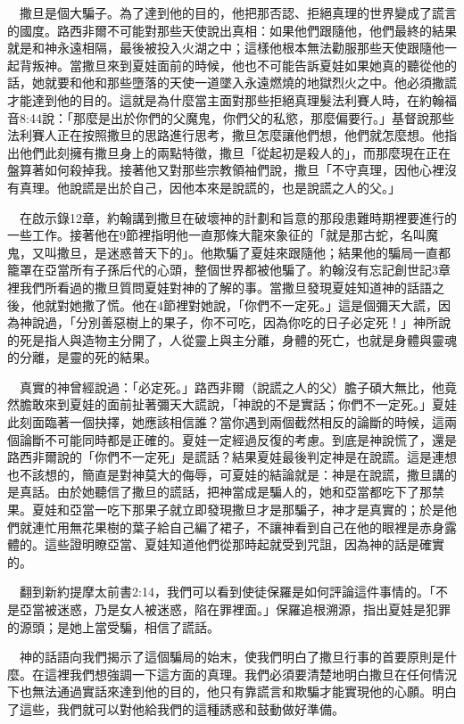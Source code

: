 \documentclass{book}
\begin{document}
　撒旦是個大騙子。為了達到他的目的，他把那否認、拒絕真理的世界變成了謊言的國度。路西非爾不可能對那些天使說出真相：如果他們跟隨他，他們最終的結果就是和神永遠相隔，最後被投入火湖之中；這樣他根本無法勸服那些天使跟隨他一起背叛神。當撒旦來到夏娃面前的時候，他也不可能告訴夏娃如果她真的聽從他的話，她就要和他和那些墮落的天使一道墜入永遠燃燒的地獄烈火之中。他必須撒謊才能達到他的目的。這就是為什麼當主面對那些拒絕真理髮法利賽人時，在約翰福音8:44說：「那麼是出於你們的父魔鬼，你們父的私慾，那麼偏要行。」基督說那些法利賽人正在按照撒旦的思路進行思考，撒旦怎麼讓他們想，他們就怎麼想。他指出他們此刻擁有撒旦身上的兩點特徵，撒旦「從起初是殺人的」，而那麼現在正在盤算著如何殺掉我。接著他又對那些宗教領袖們說，撒旦「不守真理，因他心裡沒有真理。他說謊是出於自己，因他本來是說謊的，也是說謊之人的父。」

　在啟示錄12章，約翰講到撒旦在破壞神的計劃和旨意的那段患難時期裡要進行的一些工作。接著他在9節裡指明他一直那條大龍來象征的「就是那古蛇，名叫魔鬼，又叫撒旦，是迷惑普天下的」。他欺騙了夏娃來跟隨他；結果他的騙局一直都籠罩在亞當所有子孫后代的心頭，整個世界都被他騙了。約翰沒有忘記創世記3章裡我們所看過的撒旦質問夏娃對神的了解的事。當撒旦發現夏娃知道神的話語之後，他就對她撒了慌。他在4節裡對她說，「你們不一定死。」這是個彌天大謊，因為神說過，「分別善惡樹上的果子，你不可吃，因為你吃的日子必定死！」神所說的死是指人與造物主分開了，人從靈上與主分離，身體的死亡，也就是身體與靈魂的分離，是靈的死的結果。

　真實的神曾經說過：「必定死。」路西非爾（說謊之人的父）膽子碩大無比，他竟然膽敢來到夏娃的面前扯著彌天大謊說，「神說的不是實話；你們不一定死。」夏娃此刻面臨著一個抉擇，她應該相信誰？當你遇到兩個截然相反的論斷的時候，這兩個論斷不可能同時都是正確的。夏娃一定經過反復的考慮。到底是神說慌了，還是路西非爾說的「你們不一定死」是謊話？結果夏娃最後判定神是在說謊。這是連想也不該想的，簡直是對神莫大的侮辱，可夏娃的結論就是：神是在說謊，撒旦講的是真話。由於她聽信了撒旦的謊話，把神當成是騙人的，她和亞當都吃下了那禁果。夏娃和亞當一吃下那果子就立即發現撒旦才是那騙子，神才是真實的；於是他們就連忙用無花果樹的葉子給自己編了裙子，不讓神看到自己在他的眼裡是赤身露體的。這些證明瞭亞當、夏娃知道他們從那時起就受到咒詛，因為神的話是確實的。

　翻到新約提摩太前書2:14，我們可以看到使徒保羅是如何評論這件事情的。「不是亞當被迷惑，乃是女人被迷惑，陷在罪裡面。」保羅追根溯源，指出夏娃是犯罪的源頭；是她上當受騙，相信了謊話。

　神的話語向我們揭示了這個騙局的始末，使我們明白了撒旦行事的首要原則是什麼。在這裡我們想強調一下這方面的真理。我們必須要清楚地明白撒旦在任何情況下也無法通過實話來達到他的目的，他只有靠謊言和欺騙才能實現他的心願。明白了這些，我們就可以對他給我們的這種誘惑和鼓動做好準備。
\end{document}
